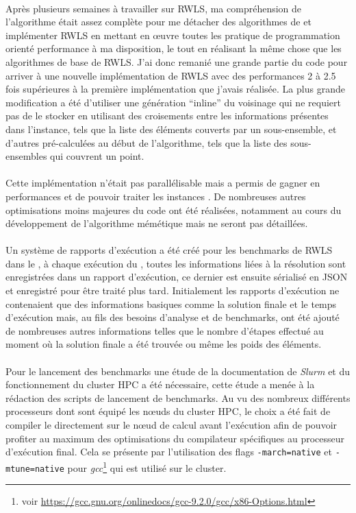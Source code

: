 \documentclass[a4paper,11pt,twoside,french,report]{../common/simplem}
\begin{document}
				\paragraph*{}
					Après plusieurs semaines à travailler sur \gls{RWLS}, ma compréhension de l'algorithme était assez complète pour me détacher des algorithmes de \cite{Gao2015} et implémenter \gls{RWLS} en mettant en œuvre toutes les pratique de programmation orienté performance à ma disposition, le tout en réalisant la même chose que les algorithmes de base de \gls{RWLS}. J'ai donc remanié une grande partie du code pour arriver à une nouvelle implémentation de \gls{RWLS} avec des performances 2 à 2.5 fois supérieures à la première implémentation que j'avais réalisée. La plus grande modification a été d'utiliser une génération ``inline'' du voisinage qui ne requiert pas de le stocker en utilisant des croisements entre les informations présentes dans l'instance, tels que la liste des éléments couverts par un sous-ensemble, et d'autres pré-calculées au début de l'algorithme, tels que la liste des sous-ensembles qui couvrent un point.
				\paragraph*{}
					Cette implémentation n'était pas parallélisable mais a permis de gagner en performances et de pouvoir traiter les instances . De nombreuses autres optimisations moins majeures du code ont été réalisées, notamment au cours du développement de l'algorithme mémétique mais ne seront pas détaillées.
				\paragraph*{}
					Un système de rapports d'exécution a été créé pour les benchmarks de \gls{RWLS} dans le \solver{}, à chaque exécution du \solver{}, toutes les informations liées à la résolution sont enregistrées dans un rapport d'exécution, ce dernier est ensuite sérialisé en JSON et enregistré pour être traité plus tard. Initialement les rapports d'exécution ne contenaient que des informations basiques comme la solution finale et le temps d'exécution mais, au fils des besoins d'analyse et de benchmarks, ont été ajouté de nombreuses autres informations telles que le nombre d'étapes effectué au moment où la solution finale a été trouvée ou même les poids des éléments.
				\paragraph*{}
					Pour le lancement des benchmarks une étude de la documentation de \textit{Slurm} et du fonctionnement du cluster \gls{HPC} a été nécessaire, cette étude a menée à la rédaction des scripts de lancement de benchmarks. Au vu des nombreux différents processeurs dont sont équipé les nœuds du cluster \gls{HPC}, le choix a été fait de compiler le \solver{} directement sur le nœud de calcul avant l'exécution afin de pouvoir profiter au maximum des optimisations du compilateur spécifiques au processeur d'exécution final. Cela se présente par l'utilisation des flags \texttt{-march=native} et \texttt{-mtune=native} pour \textit{gcc}\footnote{voir \url{https://gcc.gnu.org/onlinedocs/gcc-9.2.0/gcc/x86-Options.html}} qui est utilisé sur le cluster.
\end{document}
